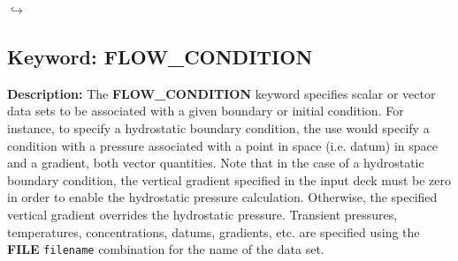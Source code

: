 \documentclass[12pt]{article}
\newcommand\return{{\hfill$\hookrightarrow$}}
\begin{document}
\hyperlink{target_key}{\return}


\newpage
\protect\hypertarget{target_flow_cond}{}

\subsection{Keyword: FLOW\_CONDITION}

{\noindent\bf Description:}
The {\bf FLOW\_CONDITION} keyword specifies scalar or vector data sets to be associated with a given boundary or initial condition.  For instance, to specify a hydrostatic boundary condition, the use would specify a condition with a pressure associated with a point in space (i.e. datum) in space and a gradient, both vector quantities.  Note that in the case of a hydrostatic boundary condition, the vertical gradient specified in the input deck must be zero in order to enable the hydrostatic pressure calculation.  Otherwise, the specified vertical gradient overrides the hydrostatic pressure.  Transient pressures, temperatures, concentrations, datums, gradients, etc. are specified using the {\bf FILE} {\tt filename} combination for the name of the data set.
\end{document}
